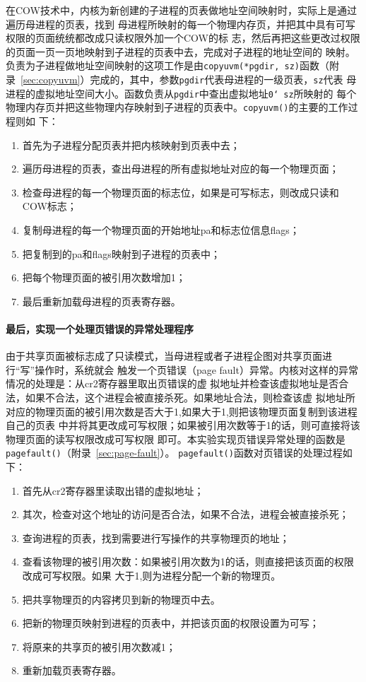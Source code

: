 \documentclass{swfcthesismscctex}
\begin{document}
在COW技术中，内核为新创建的子进程的页表做地址空间映射时，实际上是通过遍历母进程的页表，找到
母进程所映射的每一个物理内存页，并把其中具有可写权限的页面统统都改成只读权限外加一个COW的标
志，然后再把这些更改过权限的页面一页一页地映射到子进程的页表中去，完成对子进程的地址空间的
映射。负责为子进程做地址空间映射的这项工作是由\texttt{copyuvm(*pgdir, sz)}函数（附
录~\ref{sec:copyuvm}）完成的，其中，参数\texttt{pgdir}代表母进程的一级页表，\texttt{sz}代表
母进程的虚拟地址空间大小。函数负责从\texttt{pgdir}中查出虚拟地址\texttt{0\char`~sz}所映射的
每个物理内存页并把这些物理内存映射到子进程的页表中。\texttt{copyuvm()}的主要的工作过程则如
下：
\begin{enumerate}
\item 首先为子进程分配页表并把内核映射到页表中去；
\item 遍历母进程的页表，查出母进程的所有虚拟地址对应的每一个物理页面； 
\item 检查母进程的每一个物理页面的标志位，如果是可写标志，则改成只读和COW标志；
\item 复制母进程的每一个物理页面的开始地址pa和标志位信息flags；
\item 把复制到的pa和flags映射到子进程的页表中；
\item 把每个物理页面的被引用次数增加1；
\item 最后重新加载母进程的页表寄存器。
\end{enumerate}

\paragraph{最后，实现一个处理页错误的异常处理程序}

由于共享页面被标志成了只读模式，当母进程或者子进程企图对共享页面进行``写''操作时，系统就会
触发一个页错误（page fault）异常。内核对这样的异常情况的处理是：从cr2寄存器里取出页错误的虚
拟地址并检查该虚拟地址是否合法，如果不合法，这个进程会被直接杀死。如果地址合法，则检查该虚
拟地址所对应的物理页面的被引用次数是否大于1,如果大于1,则把该物理页面复制到该进程自己的页表
中并将其更改成可写权限；如果被引用次数等于1的话，则可直接将该物理页面的读写权限改成可写权限
即可。本实验实现页错误异常处理的函数是\texttt{pagefault()}（附录~\ref{sec:page-fault}）。
\texttt{pagefault()}函数对页错误的处理过程如下：
\begin{enumerate}
\item 首先从cr2寄存器里读取出错的虚拟地址；
\item 其次，检查对这个地址的访问是否合法，如果不合法，进程会被直接杀死；
\item 查询进程的页表，找到需要进行写操作的共享物理页的地址；
\item 查看该物理的被引用次数：如果被引用次数为1的话，则直接把该页面的权限改成可写权限。如果
  大于1,则为进程分配一个新的物理页。
\item 把共享物理页的内容拷贝到新的物理页中去。
\item 把新的物理页映射到进程的页表中，并把该页面的权限设置为可写；
\item 将原来的共享页的被引用次数减1；
\item 重新加载页表寄存器。
\end{enumerate}
\end{document}
